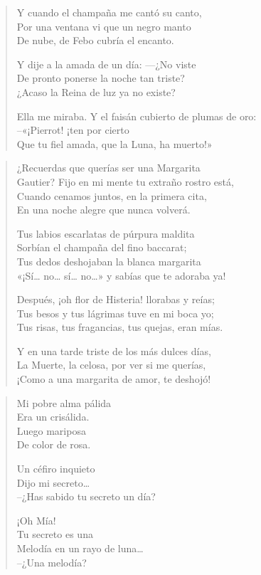 \documentclass[12pt]{article}
\begin{document}
\begin{verse}
Y cuando el champaña me cantó su canto,\\
Por una ventana vi que un negro manto\\
De nube, de Febo cubría el encanto.  

Y dije a la amada de un día: —¿No viste\\
De pronto ponerse la noche tan triste?\\
¿Acaso la Reina de luz ya no existe?  

Ella me miraba. Y el faisán cubierto de plumas de oro:\\
--«¡Pierrot! ¡ten por cierto\\
Que tu fiel amada, que la Luna, ha muerto!»  

\end{verse}

\clearpage
{}
\begin{verse}

¿Recuerdas que querías ser una Margarita\\
Gautier? Fijo en mi mente tu extraño rostro está,\\
Cuando cenamos juntos, en la primera cita,\\
En una noche alegre que nunca volverá.  

Tus labios escarlatas de púrpura maldita\\
Sorbían el champaña del fino baccarat;\\
Tus dedos deshojaban la blanca margarita\\
«¡Sí\ldots{} no\ldots{} sí\ldots{} no\ldots{}» y sabías que te adoraba ya!  

Después, ¡oh flor de Histeria! llorabas y reías;\\
Tus besos y tus lágrimas tuve en mi boca yo;\\
Tus risas, tus fragancias, tus quejas, eran mías.  

Y en una tarde triste de los más dulces días,\\
La Muerte, la celosa, por ver si me querías,\\
¡Como a una margarita de amor, te deshojó!  

\end{verse}

\clearpage
{}
\begin{verse}

Mi pobre alma pálida\\
Era un crisálida.\\
Luego mariposa\\
De color de rosa.  

Un céfiro inquieto\\
Dijo mi secreto…\\
--¿Has sabido tu secreto un día?  

¡Oh Mía!\\
Tu secreto es una\\
Melodía en un rayo de luna\ldots{}\\
--¿Una melodía?  

\end{verse}
\end{document}
